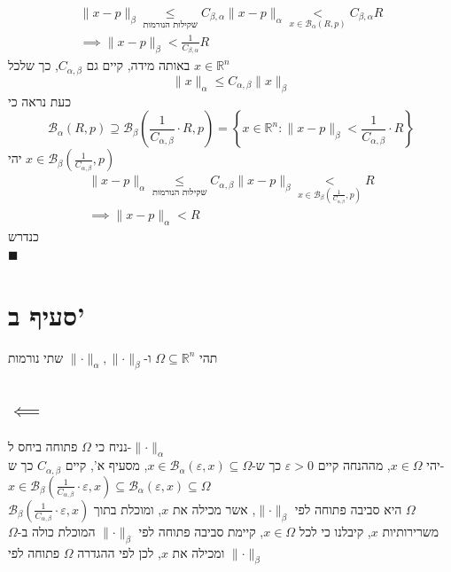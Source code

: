 \documentclass[12pt, titlepage]{article}
\begin{document}
\begin{gather*}
  \lVert x-p\rVert_\beta \underset{\text{שקילות הנורמות}}{\leq} C_{\beta,\alpha} \lVert x-p \rVert_\alpha \underset{x\in\mathcal{B}_\alpha\left(R,p\right)}{<} C_{\beta,\alpha}R\\
  \implies \lVert x-p \rVert_\beta<\frac{1}{C_{\beta,\alpha}} R
\end{gather*}
באותה מידה, קיים גם $C_{\alpha,\beta}$, כך שלכל $x\in\mathbb{R}^n$
\[
  \lVert x\rVert_\alpha \leq C_{\alpha,\beta} \lVert x\rVert_\beta
\]
כעת נראה כי 
\[
  \mathcal{B}_\alpha \left(R,p\right) \supseteq \mathcal{B}_\beta \left(\frac{1}{C_{\alpha,\beta}}\cdot R, p\right) = \left\{x\in\mathbb{R}^n :\lVert x-p\rVert_\beta < \frac{1}{C_{\alpha,\beta}} \cdot R\right\}
\]
יהי $x\in\mathcal{B}_\beta\left(\frac{1}{C_{\alpha,\beta}},p\right)$
\begin{gather*}
  \lVert x-p\rVert_\alpha \underset{\text{שקילות הנורמות}}{\leq} C_{\alpha,\beta} \lVert x-p \rVert_\beta \underset{x\in\mathcal{B}_\beta\left(\frac{1}{C_{\alpha,\beta}},p\right)}{<} R\\
  \implies \lVert x-p \rVert_\alpha< R
\end{gather*}
כנדרש\\
$\blacksquare$
\section*{סעיף ב'}
תהי $\Omega \subseteq \mathbb{R}^n$ ו-$\lVert \cdot \rVert_\alpha, \lVert \cdot \rVert_\beta$ שתי נורמות
\subsection*{$\impliedby$}
נניח כי $\Omega$ פתוחה ביחס ל-$\lVert \cdot \rVert_\alpha$\\
יהי $x\in\Omega$, מההנחה קיים $\varepsilon>0$ כך ש-$x\in\mathcal{B}_\alpha\left(\varepsilon,x\right)\subseteq \Omega$, מסעיף א', קיים $C_{\alpha,\beta}$ כך ש-$x\in\mathcal{B}_\beta\left(\frac{1}{C_{\alpha,\beta}}\cdot\varepsilon,x\right)\subseteq \mathcal{B}_\alpha\left(\varepsilon,x\right)\subseteq \Omega$\\
$\mathcal{B}_\beta\left(\frac{1}{C_{\alpha,\beta}}\cdot\varepsilon,x\right)$ היא סביבה פתוחה לפי $\lVert \cdot \rVert_\beta$, אשר מכילה את $x$, ומוכלת בתוך $\Omega$\\
משרירותיות $x$, קיבלנו כי לכל $x\in\Omega$, קיימת סביבה פתוחה לפי $\lVert \cdot \rVert_\beta$ המוכלת כולה ב-$\Omega$ ומכילה את $x$, לכן לפי ההגדרה $\Omega$ פתוחה לפי $\lVert \cdot \rVert_\beta$
\end{document}
